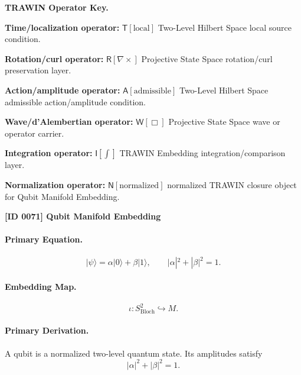 \par\vspace{0.45\baselineskip}
\noindent\begin{minipage}[t]{\linewidth}
\begingroup
\small
\raggedright
\textbf{TRAWIN Operator Key.}\par
\noindent\textbf{Time/localization operator:} $\mathsf{T}\!\left[\mathrm{local}\right]$ Two-Level Hilbert Space local source condition.\par
\noindent\textbf{Rotation/curl operator:} $\mathsf{R}\!\left[\nabla\times\right]$ Projective State Space rotation/curl preservation layer.\par
\noindent\textbf{Action/amplitude operator:} $\mathsf{A}\!\left[\mathrm{admissible}\right]$ Two-Level Hilbert Space admissible action/amplitude condition.\par
\noindent\textbf{Wave/d'Alembertian operator:} $\mathsf{W}\!\left[\Box\right]$ Projective State Space wave or operator carrier.\par
\noindent\textbf{Integration operator:} $\mathsf{I}\!\left[\int\right]$ TRAWIN Embedding integration/comparison layer.\par
\noindent\textbf{Normalization operator:} $\mathsf{N}\!\left[\mathrm{normalized}\right]$ normalized TRAWIN closure object for Qubit Manifold Embedding.\par
\endgroup
\end{minipage}

\clearpage
\noindent\textbf{[ID 0071] Qubit Manifold Embedding}\par
\vspace{0.35em}
\paragraph{Primary Equation.}
\begin{equation}
|\psi\rangle = \alpha|0\rangle+\beta|1\rangle,
\qquad
|\alpha|^2+|\beta|^2=1 .
\end{equation}

\paragraph{Embedding Map.}
\begin{equation}
\iota:S^2_{\mathrm{Bloch}}\hookrightarrow M .
\end{equation}

\paragraph{Primary Derivation.}
A qubit is a normalized two-level quantum state. Its amplitudes satisfy
\begin{equation}
|\alpha|^2+|\beta|^2=1 .
\end{equation}

